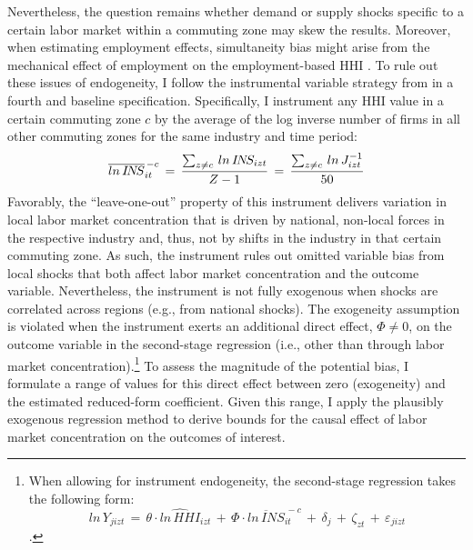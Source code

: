 \documentclass[11pt,oneside,reqno,xcolor=dvipsnames]{article} %
\begin{document}
Nevertheless, the question remains whether demand or supply shocks specific to a certain labor market within a commuting zone may skew the results. Moreover, when estimating employment effects, simultaneity bias might arise from the mechanical effect of employment on the employment-based HHI \citep{MarinescuEtAl2021}. To rule out these issues of endogeneity, I follow the instrumental variable strategy from \citet{AzarEtAl2017} in a fourth and baseline specification. Specifically, I instrument any HHI value in a certain commuting zone $c$ by the average of the log inverse number of firms in all other commuting zones for the same industry and time period:
\begin{equation}
\label{eq:3}
\overline{ln\,I\!N\!S}^{\,-c}_{it} \,=\,  \frac{\sum_{z \neq c\vphantom{/}} \, ln\,I\!N\!S_{izt}}{Z-1} \,=\, \frac{\sum_{z \neq c\vphantom{/}} \, ln\,J^{-1}_{izt}}{50}
\end{equation}
Favorably, the ``leave-one-out'' property of this instrument delivers variation in local labor market concentration that is driven by national, non-local forces in the respective industry and, thus, not by shifts in the industry in that certain commuting zone. As such, the instrument rules out omitted variable bias from local shocks that both affect labor market concentration and the outcome variable. Nevertheless, the instrument is not fully exogenous when shocks are correlated across regions (e.g., from national shocks). The exogeneity assumption is violated when the instrument exerts an additional direct effect, $\Phi\neq0$, on the outcome variable in the second-stage regression (i.e., other than through labor market concentration).\footnote{When allowing for instrument endogeneity, the second-stage regression takes the following form: \begin{equation*} ln\,Y_{jizt} \,=\,  \theta \cdot \widehat{ln\,H\!H\!I}_{izt} \,+\, \Phi \cdot \overline{ln\,I\!N\!S}^{\,-c}_{it}  \,+\, \delta_{j}  \,+\, \zeta_{zt}  \,+\, \varepsilon_{jizt} \end{equation*}.} To assess the magnitude of the potential bias, I formulate a range of values for this direct effect between zero (exogeneity) and the estimated reduced-form coefficient. Given this range, I apply the plausibly exogenous regression method \citep{ConleyEtAl2012} to derive bounds for the causal effect of labor market concentration on the outcomes of interest.
\end{document}
